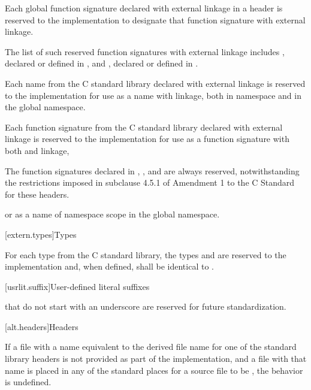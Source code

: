 \pnum
Each
%
global function signature declared with
%
external linkage in a header is reserved to the
implementation to designate that function signature with
%
external linkage.%
\begin{footnote}
The list of such reserved function
signatures with external linkage includes
%
,
declared or defined in ,
and
%
%
,
declared or defined in
.
\end{footnote}

\pnum
Each name from the C standard library declared with external linkage
%
is reserved to the implementation for use as a name with
%
%
linkage,
both in namespace  and in the global namespace.

\pnum
Each function signature from the C standard library declared with
%
external linkage
is reserved to the implementation for use as
a function signature with both
%
and
%
linkage,
\begin{footnote}
The function signatures declared in
%
,
,
and
are always reserved, notwithstanding the restrictions imposed in subclause
4.5.1 of Amendment 1 to the C Standard for these headers.
\end{footnote}
or as a name of namespace scope in the global namespace.

[extern.types]{Types}

\pnum
For each type  from the C standard library,
the types
and
are reserved to the implementation and, when defined,
shall be identical to
.

[usrlit.suffix]{User-defined literal suffixes}

\pnum
{} that do not start with an underscore are reserved for future standardization.

[alt.headers]{Headers}

\pnum
If a file with a name
equivalent to the derived file name for one of the \Cpp{} standard library headers
is not provided as part of the implementation, and a file with that name
is placed in any of the standard places for a source file to be ,
the behavior is undefined.%
%


